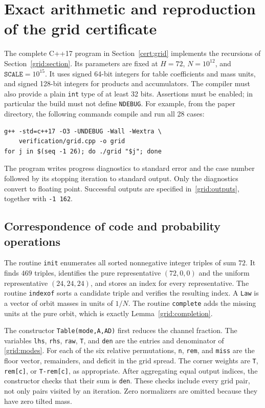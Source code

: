 \section{Exact arithmetic and reproduction of the grid certificate}
\label{grid:implementation}

The complete C++17 program in Section~\ref{cert:grid} implements the
recursions of Section~\ref{grid:section}.  Its parameters are fixed at
$H=72$, $N=10^{12}$, and $\mathtt{SCALE}=10^{15}$.  It uses signed
64-bit integers for table coefficients and mass units, and signed
128-bit integers for products and accumulators. The compiler must also
provide a plain \texttt{int} type of at least 32 bits. Assertions must be
enabled; in particular the build must not define \texttt{NDEBUG}.
For example, from the paper directory, the following commands compile and run all 28 cases:
\begin{verbatim}
g++ -std=c++17 -O3 -UNDEBUG -Wall -Wextra \
    verification/grid.cpp -o grid
for j in $(seq -1 26); do ./grid "$j"; done
\end{verbatim}
The program writes progress diagnostics to standard error and the case
number followed by its stopping iteration to standard output.  Only
the diagnostics convert to floating point.  Successful outputs are
specified in~\eqref{grid:outputs}, together with \texttt{-1 162}.

\subsection{Correspondence of code and probability operations}

The routine \texttt{init} enumerates all sorted nonnegative integer
triples of sum $72$.  It finds $469$ triples, identifies the pure
representative $(72,0,0)$ and the uniform representative $(24,24,24)$,
and stores an index for every representative.  The routine
\texttt{indexof} sorts a candidate triple and verifies the resulting
index.  A \texttt{Law} is a vector of orbit masses in units of $1/N$.
The routine \texttt{complete} adds the missing units at the pure orbit,
which is exactly Lemma~\ref{grid:completion}.

The constructor \texttt{Table(mode,A,AD)} first reduces the channel
fraction.  The variables \texttt{lhs}, \texttt{rhs}, \texttt{raw},
\texttt{T}, and \texttt{den} are the entries and denominator of
\eqref{grid:modes}.  For each of the six relative permutations,
\texttt{n}, \texttt{rem}, and \texttt{miss} are the floor vector,
remainders, and deficit in the grid spread.  The corner weights are
\texttt{T}, \texttt{rem[c]}, or \texttt{T-rem[c]}, as appropriate.
After aggregating equal output indices, the constructor checks that
their sum is \texttt{den}.  These checks include every grid pair, not
only pairs visited by an iteration.  Zero normalizers are omitted
because they have zero tilted mass.

